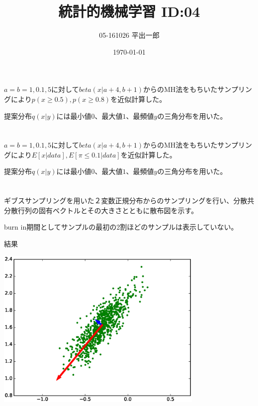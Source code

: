 \documentclass[a4j]{jarticle}
\title{統計的機械学習 ID:04}
\author{05-161026 平出一郎}
\date{\today}
\begin{document}
\thispagestyle{empty}
\maketitle
\pagebreak


\section{}
$a=b=1,0.1,5$に対して$beta(x|a+4,b+1)$からのMH法をもちいたサンプリングにより$p(x \geq 0.5),p(x \geq 0.8)$を近似計算した。

提案分布$q(x|y)$には最小値$0$、最大値$1$、最頻値$y$の三角分布を用いた。




\section{}
$a=b=1,0.1,5$に対して$beta(x|a+4,b+1)$からのMH法をもちいたサンプリングにより$E[x|data],E[\pi \leq 0.1|data]$を近似計算した。

提案分布$q(x|y)$には最小値$0$、最大値$1$、最頻値$y$の三角分布を用いた。



\section{}
ギブスサンプリングを用いた２変数正規分布からのサンプリングを行い、分散共分散行列の固有ベクトルとその大きさとともに散布図を示す。

burn in期間としてサンプルの最初の2割ほどのサンプルは表示していない。


結果

\includegraphics[width=10cm]{figure_1.eps}


\end{document}
